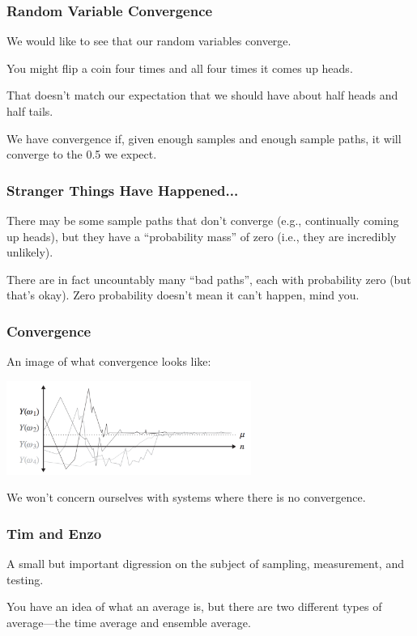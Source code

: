 \begin{frame}
\frametitle{Random Variable Convergence}

We would like to see that our random variables converge. 

You might flip a coin four times and all four times it comes up heads. 

That doesn't match our expectation that we should have about half heads and half tails.

We have convergence if, given enough samples and enough sample paths, it will converge to the 0.5 we expect. 

\end{frame}


\begin{frame}
\frametitle{Stranger Things Have Happened...}

There may be some sample paths that don't converge (e.g., continually coming up heads), but they have a ``probability mass'' of zero (i.e., they are incredibly unlikely).  

There are in fact uncountably many ``bad paths'', each with probability zero (but that's okay). Zero probability doesn't mean it can't happen, mind you.

\end{frame}



\begin{frame}
\frametitle{Convergence}

An image of what convergence looks like:

\begin{center}
	\includegraphics[width=0.6\textwidth]{images/convergence.png}
\end{center}

We won't concern ourselves with systems where there is no convergence. 

\end{frame}



\begin{frame}
\frametitle{Tim and Enzo}

A small but important digression on the subject of sampling, measurement, and testing.

You have an idea of what an average is, but there are two different types of average---the time average and ensemble average. 


\end{frame}



